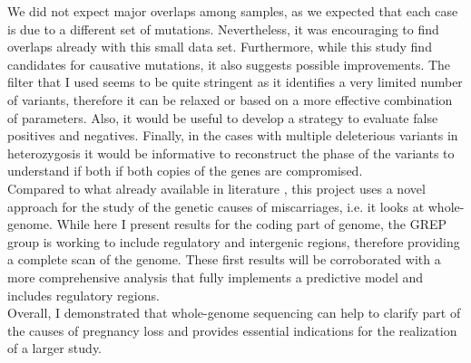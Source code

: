 We did not expect major overlaps among samples, as we expected that each case is due to a different set of mutations. Nevertheless, it was encouraging to find overlaps already with this small data set. Furthermore, while this study find candidates for causative mutations, it also suggests possible improvements. The filter that I used  seems to be quite stringent as it identifies a very limited number of variants, therefore it can be relaxed or based on a more effective combination of parameters. Also, it would be useful to develop a strategy to evaluate false positives and negatives. Finally, in the cases with multiple deleterious variants in heterozygosis it would be informative to reconstruct the phase of the variants to understand if both  if both copies of the genes are compromised.\\ 


Compared to what already available in literature \cite{laisk2019genetic,qiao2016whole,fu2018whole}, this project uses a novel approach for the study of the genetic causes of miscarriages, i.e. it looks at whole-genome. While here I present results for the coding part of genome, the GREP group is working to include regulatory and intergenic regions, therefore providing a complete scan of the genome. These first results will be corroborated with a more comprehensive analysis that fully implements a predictive model and includes regulatory regions.\\


Overall, I demonstrated that whole-genome sequencing can help to clarify part of the causes of pregnancy loss and provides essential indications for the realization of a larger study.




